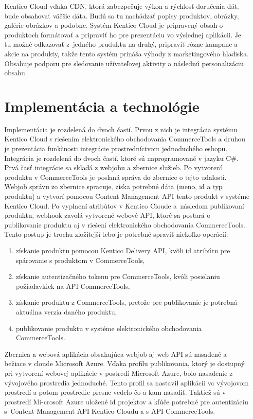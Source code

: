 \documentclass[
  printed, %
  table,   %
  lof,     %
  nolot,     %
  twoside,  
]{fithesis3}
\begin{document}
Kentico Cloud vďaka CDN, ktorá zabezpečuje výkon a rýchlosť doručenia dát, bude obsahovať väčšie dáta. Budú sa tu nachádzať popisy produktov, obrázky, galérie obrázkov a podobne. Systém Kentico Cloud je pripravený obsah o produktoch formátovať a pripraviť ho pre prezentáciu vo výslednej aplikácii. Je tu možné odkazovať z~jedného pruduktu na druhý, pripraviť rôzne kampane a akcie na produkty, takže tento systém prináša výhody z marketingového hľadiska. Obsahuje podporu pre sledovanie užívateľovej aktivity a následnú personalizáciu obsahu.

\chapter{Implementácia a technológie}
Implementácia je rozdelená do dvoch častí. Prvou z nich je integrácia systému Kentico Cloud s riešením elektronického obchodovania CommerceTools a druhou je prezentácia funkčnosti integrácie prostredníctvom jednoduchého eshopu.  
Integrácia je rozdelená do dvoch častí, ktoré sú naprogramované v jazyku C\#. Prvá časť integrácie sa skladá z webjobu a zbernice služieb. Po vytvorení produktu v CommerceTools je poslaná správa do zbernice o tejto udalosti. Webjob správu zo zbernice spracuje, získa potrebné dáta (meno, id a typ produktu) a vytvorí pomocou Content Management API tento produkt v systéme Kentico Cloud. Po vyplnení atribútov v Kentico Cloude a~následom publikovaní produktu, webhook zavolá vytvorené webové API, ktoré sa postará o publikovanie produktu aj v riešení elektronického obchodovania CommerceTools. Tento postup je trochu zložitejší lebo je potrebné spraviť niekoľko operácií: 
\begin{enumerate}
	\item získanie produktu pomocou Kentico Delivery API, kvôli id atribútu pre spárovanie s produktom v CommerceTools,
	\item získanie autentizačného tokenu pre CommerceTools, kvôli posielaniu požiadavkiek na API CommerceTools,
	\item získanie produktu z CommerceTools, pretože pre publikovanie je potrebná aktuálna verzia daného produktu,
	\item publikovanie produktu v systéme elektronického obchodovania CommerceTools.
\end{enumerate}

Zbernica a webová aplikácia obsahujúca webjob aj web API sú nasadené a bežiace v cloude Microsoft Azure. Vďaka profilu publikovania, ktorý je dostupný pri vytvorení webovej aplikácie v postredí Microsoft Azure, bolo nasadenie z vývojového prostredia jednoduché. Tento profil sa nastavil aplikácii vo vývojovom prostredí a potom prostredie presne vedelo čo a kam nasadiť. Taktiež sú v prostredí Mi-crosoft Azure uložené id projektov a kľúče potrebné pre autentizáciu s~Content Management API Kentico Cloudu a s API CommerceTools. 
\end{document}
